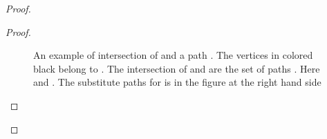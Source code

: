 \begin{proof}
\begin{proof}
\begin{figure}
\caption{An example of intersection of  and a path . 
The vertices in  colored black belong to . 
The intersection of  and  are the set of paths 
. Here  and . 
The substitute paths for  is in the figure at the right hand side}
\label{figure_cyclepathintersection}
\end{figure}



































\end{proof}
\end{proof}
